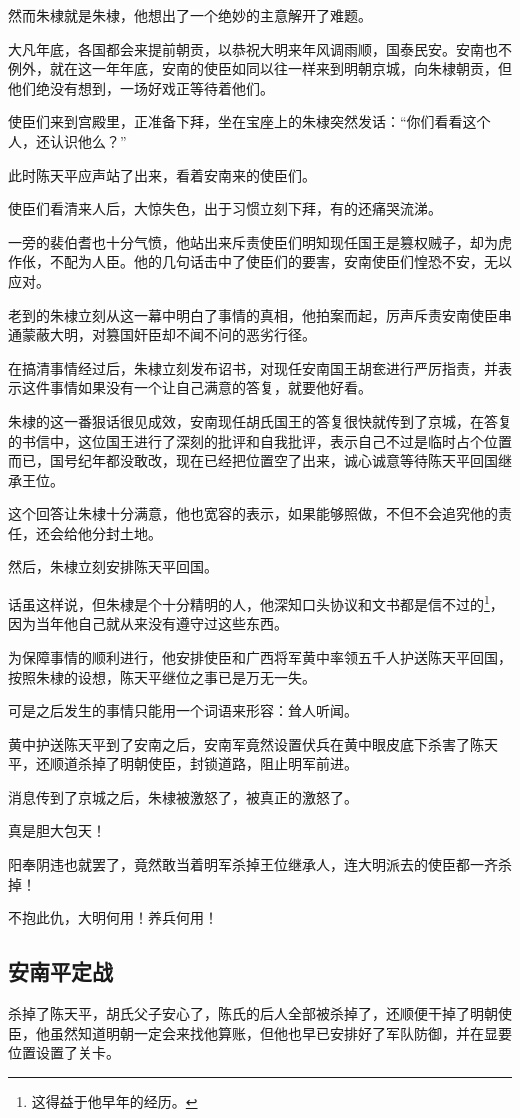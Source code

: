 \begin{multicols}{\theparacolNo}
然而朱棣就是朱棣，他想出了一个绝妙的主意解开了难题。

大凡年底，各国都会来提前朝贡，以恭祝大明来年风调雨顺，国泰民安。安南也不例外，就在这一年年底，安南的使臣如同以往一样来到明朝京城，向朱棣朝贡，但他们绝没有想到，一场好戏正等待着他们。

使臣们来到宫殿里，正准备下拜，坐在宝座上的朱棣突然发话：“你们看看这个人，还认识他么？”

此时陈天平应声站了出来，看着安南来的使臣们。

使臣们看清来人后，大惊失色，出于习惯立刻下拜，有的还痛哭流涕。

一旁的裴伯耆也十分气愤，他站出来斥责使臣们明知现任国王是篡权贼子，却为虎作伥，不配为人臣。他的几句话击中了使臣们的要害，安南使臣们惶恐不安，无以应对。

老到的朱棣立刻从这一幕中明白了事情的真相，他拍案而起，厉声斥责安南使臣串通蒙蔽大明，对篡国奸臣却不闻不问的恶劣行径。

在搞清事情经过后，朱棣立刻发布诏书，对现任安南国王胡奃进行严厉指责，并表示这件事情如果没有一个让自己满意的答复，就要他好看。

朱棣的这一番狠话很见成效，安南现任胡氏国王的答复很快就传到了京城，在答复的书信中，这位国王进行了深刻的批评和自我批评，表示自己不过是临时占个位置而已，国号纪年都没敢改，现在已经把位置空了出来，诚心诚意等待陈天平回国继承王位。

这个回答让朱棣十分满意，他也宽容的表示，如果能够照做，不但不会追究他的责任，还会给他分封土地。

然后，朱棣立刻安排陈天平回国。

话虽这样说，但朱棣是个十分精明的人，他深知口头协议和文书都是信不过的\footnote{这得益于他早年的经历。}，因为当年他自己就从来没有遵守过这些东西。

为保障事情的顺利进行，他安排使臣和广西将军黄中率领五千人护送陈天平回国，按照朱棣的设想，陈天平继位之事已是万无一失。

可是之后发生的事情只能用一个词语来形容：耸人听闻。

黄中护送陈天平到了安南之后，安南军竟然设置伏兵在黄中眼皮底下杀害了陈天平，还顺道杀掉了明朝使臣，封锁道路，阻止明军前进。

消息传到了京城之后，朱棣被激怒了，被真正的激怒了。

真是胆大包天！

阳奉阴违也就罢了，竟然敢当着明军杀掉王位继承人，连大明派去的使臣都一齐杀掉！

不抱此仇，大明何用！养兵何用！

\subsection{安南平定战}
杀掉了陈天平，胡氏父子安心了，陈氏的后人全部被杀掉了，还顺便干掉了明朝使臣，他虽然知道明朝一定会来找他算账，但他也早已安排好了军队防御，并在显要位置设置了关卡。


\end{multicols}
